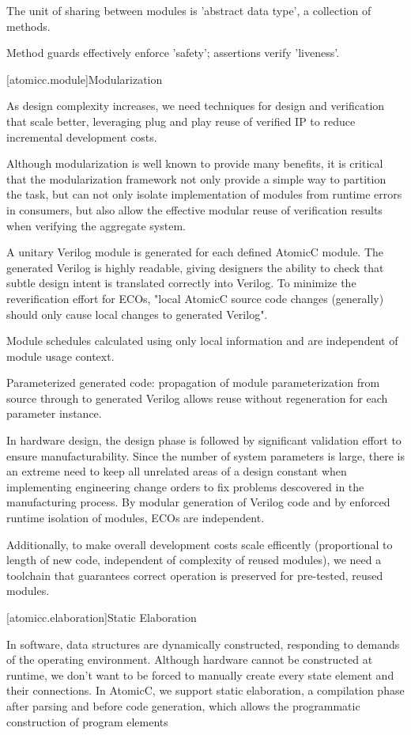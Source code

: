 The unit of sharing between modules is 'abstract data type', a collection
of methods.

Method guards effectively enforce 'safety'; assertions verify 'liveness'.

[atomicc.module]{Modularization}

As design complexity increases, we need techniques for design and verification
that scale better,
leveraging plug and play reuse of verified IP to reduce incremental development costs.

Although modularization is well known to provide many benefits,
it is critical that the modularization framework not only provide a
simple way to partition the task, but can not only isolate implementation of
modules from runtime errors in consumers, but also allow the effective
modular reuse of verification results when verifying the
aggregate system.

A unitary Verilog module is generated for each defined AtomicC module.
The generated Verilog is highly readable, giving designers 
the ability to check that subtle design intent is translated correctly into Verilog.
To minimize the reverification effort for ECOs,
"local AtomicC source code changes (generally) should only cause local changes to generated Verilog".

Module schedules calculated using only local information and are independent of module usage context.

Parameterized generated code: propagation of module parameterization from
source through to generated Verilog allows reuse without regeneration for each parameter instance.

In hardware design, the design phase is followed by significant validation effort
to ensure manufacturability.  Since the number of system parameters is
large, there is an extreme need to keep all unrelated areas of a design constant
when implementing engineering change orders to fix problems descovered
in the manufacturing process.
By modular generation of Verilog code and by enforced runtime isolation
of modules, ECOs are independent.

Additionally, to make overall development costs scale efficently (proportional
to length of new code, independent of complexity of reused modules), we need a
toolchain that guarantees correct operation is preserved
for pre-tested, reused modules.


[atomicc.elaboration]{Static Elaboration}

In software, data structures are dynamically constructed, responding to
demands of the operating environment.  Although hardware cannot be
constructed at runtime, we don't want to be forced to manually create every
state element and their connections.  In AtomicC, we support static elaboration,
a compilation phase after parsing and before code generation, which allows
the programmatic construction of program elements

